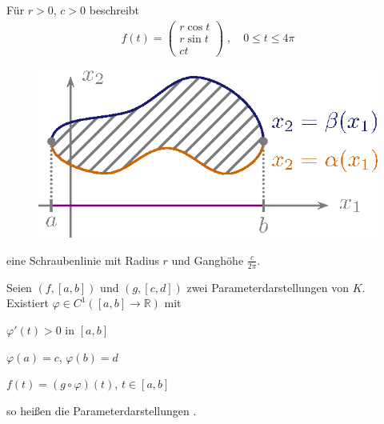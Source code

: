\documentclass[a4paper,10pt]{scrbook}
\begin{document}
\begin{example} \label{thm:6.3}
  Für $r > 0$, $c > 0$ beschreibt
  \begin{align*}
    f(t) = \begin{pmatrix} r \cos t \\ r \sin t \\ c t \end{pmatrix} \; , \quad 0 \leq t \leq 4 \pi
  \end{align*}
  \begin{figure}[H]
    \centering
    \includegraphics[scale=0.2]{images/ana3-tmp-51}
  \end{figure}
  eine Schraubenlinie mit Radius $r$ und Ganghöhe $\frac{c}{2 \pi}$.
\end{example}

\begin{theorem}[Definition]
  Seien $(f,[a,b])$ und $(g,[c,d])$ zwei Parameterdarstellungen von $K$. Existiert $\varphi \in C^1([a,b] \to \mathbb{R})$ mit
  \begin{item-triangle}
    \item $\varphi'(t) > 0$ in $[a,b]$

    \item $\varphi(a) = c$, $\varphi(b) = d$

    \item $f(t) = (g \circ \varphi)(t)$, $t \in [a,b]$
  \end{item-triangle}
  so heißen die Parameterdarstellungen .
\end{theorem}
\end{document}
